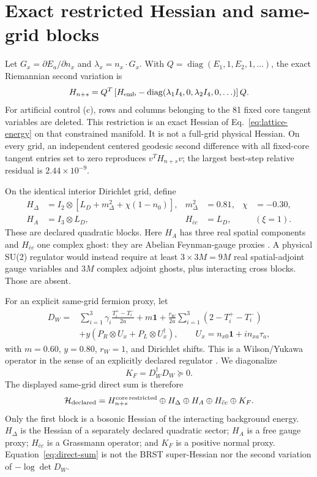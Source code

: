 \documentclass[11pt]{article}
\theoremstyle{definition}
\theoremstyle{remark}
\newcommand{\one}{\mathbf 1}
\newcommand{\diag}{\operatorname{diag}}
\newcommand{\cH}{\mathcal H}
\begin{document}
\section{Exact restricted Hessian and same-grid blocks}

Let $G_x=\partial E_a/\partial n_x$ and $\lambda_x=n_x\cdot G_x$. With
$Q=\diag(E_1,1,E_2,1,\ldots)$, the exact Riemannian second variation is
\begin{equation}
 H_{n+s}=Q^T\left[H_{\rm emb}
 -\diag(\lambda_1I_4,0,\lambda_2I_4,0,\ldots)\right]Q.
 \label{eq:riemannian-hessian}
\end{equation}
For artificial control (c), rows and columns belonging to the 81 fixed core
tangent variables are deleted. This restriction is an exact Hessian of
Eq.~\eqref{eq:lattice-energy} on that constrained manifold. It is not a
full-grid physical Hessian. On every grid, an independent centered geodesic
second difference with all fixed-core tangent entries set to zero reproduces
$v^TH_{n+s}v$; the largest best-step relative residual is
$2.44\times10^{-9}$.

On the identical interior Dirichlet grid, define
\begin{align}
 H_\Delta&=I_2\otimes\left[L_D+m_\Delta^2
 +\chi(1-n_0)\right],
 &m_\Delta^2&=0.81,&\chi&=-0.30,\label{eq:diquark}\\
 H_A&=I_3\otimes L_D,& H_{\bar cc}&=L_D,
 &&(\xi=1).\label{eq:gauge-ghost}
\end{align}
These are declared quadratic blocks. Here $H_A$ has three real spatial
components and $H_{\bar cc}$ one complex ghost: they are Abelian Feynman-gauge
proxies \cite{FaddeevPopov1967APE7}. A physical SU(2) regulator would instead
require at least $3\times3M=9M$ real spatial-adjoint gauge variables and $3M$
complex adjoint ghosts, plus interacting cross blocks. Those are absent.

For an explicit same-grid fermion proxy, let
\begin{align}
 D_W={}&\sum_{i=1}^3\gamma_i\frac{T_i^+-T_i^-}{2a}+m\one
 +\frac{r_W}{2a}\sum_{i=1}^3(2-T_i^+-T_i^-)\nonumber\\
 &+y\left(P_R\otimes U_x+P_L\otimes U_x^\dagger\right),
 \qquad U_x=n_{x0}\one+i n_{xa}\tau_a,
 \label{eq:wilson-yukawa}
\end{align}
with $m=0.60$, $y=0.80$, $r_W=1$, and Dirichlet shifts. This is a
Wilson/Yukawa operator in the sense of an explicitly declared regulator
\cite{Wilson1974APE7}. We diagonalize
\begin{equation}
 K_F=D_W^\dagger D_W\succeq0.
 \label{eq:normal}
\end{equation}
The displayed same-grid direct sum is therefore
\begin{equation}
 \cH_{\rm declared}=
 H_{n+s}^{\rm core\,restricted}\oplus H_\Delta\oplus H_A
 \oplus H_{\bar cc}\oplus K_F.
 \label{eq:direct-sum}
\end{equation}
Only the first block is a bosonic Hessian of the interacting background
energy. $H_\Delta$ is the Hessian of a separately declared quadratic sector;
$H_A$ is a free gauge proxy; $H_{\bar cc}$ is a Grassmann operator; and $K_F$
is a positive normal proxy. Equation~\eqref{eq:direct-sum} is not the BRST
super-Hessian nor the second variation of $-\log\det D_W$.
\end{document}
